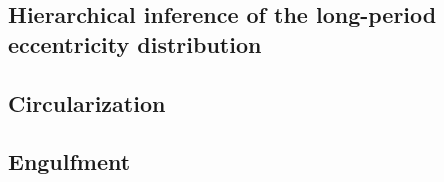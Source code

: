 \documentclass[modern]{aastex63}
\begin{document}
\subsection{Hierarchical inference of the long-period eccentricity distribution}


\subsection{Circularization}


\subsection{Engulfment}




\end{document}
